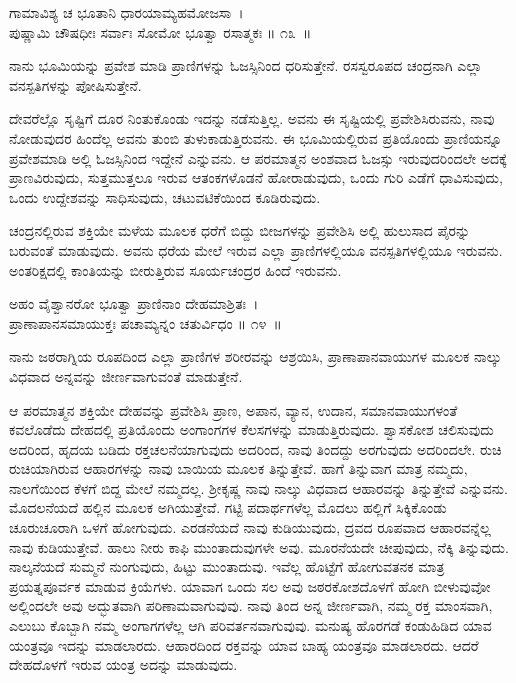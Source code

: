 \begin{shloka}
ಗಾಮಾವಿಶ್ಯ ಚ ಭೂತಾನಿ ಧಾರಯಾಮ್ಯಹಮೋಜಸಾ~।\\ಪುಷ್ಣಾಮಿ ಚೌಷಧೀಃ ಸರ್ವಾಃ ಸೋಮೋ ಭೂತ್ವಾ ರಸಾತ್ಮಕಃ \hfill॥ ೧೩~॥
\end{shloka}

\begin{artha}
ನಾನು ಭೂಮಿಯನ್ನು ಪ್ರವೇಶ ಮಾಡಿ ಪ್ರಾಣಿಗಳನ್ನು ಓಜಸ್ಸಿನಿಂದ ಧರಿಸುತ್ತೇನೆ. ರಸಸ್ವರೂಪದ ಚಂದ್ರನಾಗಿ ಎಲ್ಲಾ ವನಸ್ಪತಿಗಳನ್ನು ಪೋಷಿಸುತ್ತೇನೆ.
\end{artha}

ದೇವರೆಲ್ಲೊ ಸೃಷ್ಟಿಗೆ ದೂರ ನಿಂತುಕೊಂಡು ಇದನ್ನು ನಡೆಸುತ್ತಿಲ್ಲ. ಅವನು ಈ ಸೃಷ್ಟಿಯಲ್ಲಿ ಪ್ರವೇಶಿಸಿರುವನು, ನಾವು ನೋಡುವುದರ ಹಿಂದೆಲ್ಲ ಅವನು ತುಂಬಿ ತುಳುಕಾಡುತ್ತಿರುವನು. ಈ ಭೂಮಿಯಲ್ಲಿರುವ ಪ್ರತಿಯೊಂದು ಪ್ರಾಣಿಯನ್ನೂ ಪ್ರವೇಶಮಾಡಿ ಅಲ್ಲಿ ಓಜಸ್ಸಿನಿಂದ ಇದ್ದೇನೆ ಎನ್ನುವನು. ಆ ಪರಮಾತ್ಮನ ಅಂಶವಾದ ಓಜಸ್ಸು ಇರುವುದರಿಂದಲೇ ಅದಕ್ಕೆ ಪ್ರಾಣವಿರುವುದು, ಸುತ್ತಮುತ್ತಲೂ ಇರುವ ಆತಂಕಗಳೊಡನೆ ಹೋರಾಡುವುದು, ಒಂದು ಗುರಿ ಎಡೆಗೆ ಧಾವಿಸುವುದು, ಒಂದು ಉದ್ದೇಶವನ್ನು ಸಾಧಿಸುವುದು, ಚಟುವಟಿಕೆಯಿಂದ ಕೂಡಿರುವುದು.

ಚಂದ್ರನಲ್ಲಿರುವ ಶಕ್ತಿಯೇ ಮಳೆಯ ಮೂಲಕ ಧರೆಗೆ ಬಿದ್ದು ಬೀಜಗಳನ್ನು ಪ್ರವೇಶಿಸಿ ಅಲ್ಲಿ ಹುಲುಸಾದ ಪೈರನ್ನು ಬರುವಂತೆ ಮಾಡುವುದು. ಅವನು ಧರೆಯ ಮೇಲೆ ಇರುವ ಎಲ್ಲಾ ಪ್ರಾಣಿಗಳಲ್ಲಿಯೂ ವನಸ್ಪತಿಗಳಲ್ಲಿಯೂ ಇರುವನು. ಅಂತರಿಕ್ಷದಲ್ಲಿ ಕಾಂತಿಯನ್ನು ಬೀರುತ್ತಿರುವ ಸೂರ್ಯಚಂದ್ರರ ಹಿಂದೆ ಇರುವನು.

\begin{shloka}
ಅಹಂ ವೈಶ್ವಾನರೋ ಭೂತ್ವಾ ಪ್ರಾಣಿನಾಂ ದೇಹಮಾಶ್ರಿತಃ~।\\ಪ್ರಾಣಾಪಾನಸಮಾಯುಕ್ತಃ ಪಚಾಮ್ಯನ್ನಂ ಚತುರ್ವಿಧಂ \hfill॥ ೧೪~॥
\end{shloka}

\begin{artha}
ನಾನು ಜಠರಾಗ್ನಿಯ ರೂಪದಿಂದ ಎಲ್ಲಾ ಪ್ರಾಣಿಗಳ ಶರೀರವನ್ನು ಆಶ್ರಯಿಸಿ, ಪ್ರಾಣಾಪಾನವಾಯುಗಳ ಮೂಲಕ ನಾಲ್ಕು ವಿಧವಾದ ಅನ್ನವನ್ನು ಜೀರ್ಣವಾಗುವಂತೆ ಮಾಡುತ್ತೇನೆ.
\end{artha}

ಆ ಪರಮಾತ್ಮನ ಶಕ್ತಿಯೇ ದೇಹವನ್ನು ಪ್ರವೇಶಿಸಿ ಪ್ರಾಣ, ಅಪಾನ, ವ್ಯಾನ, ಉದಾನ, ಸಮಾನವಾಯುಗಳಂತೆ ಕವಲೊಡೆದು ದೇಹದಲ್ಲಿ ಪ್ರತಿಯೊಂದು ಅಂಗಾಂಗಗಳ ಕೆಲಸಗಳನ್ನು ಮಾಡುತ್ತಿರುವುದು. ಶ್ವಾಸಕೋಶ ಚಲಿಸುವುದು ಅದರಿಂದ, ಹೃದಯ ಬಡಿದು ರಕ್ತಚಲನೆಯಾಗುವುದು ಅದರಿಂದ, ನಾವು ತಿಂದದ್ದು ಅರಗುವುದು ಅದರಿಂದಲೇ. ರುಚಿ ರುಚಿಯಾಗಿರುವ ಆಹಾರಗಳನ್ನು ನಾವು ಬಾಯಿಯ ಮೂಲಕ ತಿನ್ನುತ್ತೇವೆ. ಹಾಗೆ ತಿನ್ನುವಾಗ ಮಾತ್ರ ನಮ್ಮದು, ನಾಲಗೆಯಿಂದ ಕೆಳಗೆ ಬಿದ್ದ ಮೇಲೆ ನಮ್ಮದಲ್ಲ. ಶ‍್ರೀಕೃಷ್ಣ ನಾವು ನಾಲ್ಕು ವಿಧವಾದ ಆಹಾರವನ್ನು ತಿನ್ನುತ್ತೇವೆ ಎನ್ನುವನು. ಮೊದಲನೆಯದೆ ಹಲ್ಲಿನ ಮೂಲಕ ಅಗಿಯುತ್ತೇವೆ. ಗಟ್ಟಿ ಪದಾರ್ಥಗಳೆಲ್ಲ ಮೊದಲು ಹಲ್ಲಿಗೆ ಸಿಕ್ಕಿಕೊಂಡು ಚೂರುಚೂರಾಗಿ ಒಳಗೆ ಹೋಗುವುದು. ಎರಡನೆಯದೆ ನಾವು ಕುಡಿಯುವುದು, ದ್ರವದ ರೂಪವಾದ ಆಹಾರವನ್ನೆಲ್ಲ ನಾವು ಕುಡಿಯುತ್ತೇವೆ. ಹಾಲು ನೀರು ಕಾಫಿ ಮುಂತಾದುವುಗಳೇ ಅವು. ಮೂರನೆಯದೇ ಚೀಪುವುದು, ನೆಕ್ಕಿ ತಿನ್ನುವುದು. ನಾಲ್ಕನೆಯದೆ ಸುಮ್ಮನೆ ನುಂಗುವುದು, ಹಿಟ್ಟು ಮುಂತಾದುವು. ಇವೆಲ್ಲ ಹೊಟ್ಟೆಗೆ ಹೋಗುವತನಕ ಮಾತ್ರ ಪ್ರಯತ್ನಪೂರ್ವಕ ಮಾಡುವ ಕ್ರಿಯೆಗಳು. ಯಾವಾಗ ಒಂದು ಸಲ ಅವು ಜಠರಕೋಶದೊಳಗೆ ಹೋಗಿ ಬೀಳುವುವೋ ಅಲ್ಲಿಂದಲೇ ಅವು ಅದ್ಭುತವಾಗಿ ಪರಿಣಾಮವಾಗುವುವು. ನಾವು ತಿಂದ ಅನ್ನ ಜೀರ್ಣವಾಗಿ, ನಮ್ಮ ರಕ್ತ ಮಾಂಸವಾಗಿ, ಎಲುಬು ಕೊಬ್ಬಾಗಿ ನಮ್ಮ ಅಂಗಾಗಗಳೆಲ್ಲ ಆಗಿ ಪರಿವರ್ತನವಾಗುವುವು. ಮನುಷ್ಯ ಹೊರಗಡೆ ಕಂಡುಹಿಡಿದ ಯಾವ ಯಂತ್ರವೂ ಇದನ್ನು ಮಾಡಲಾರದು. ಆಹಾರದಿಂದ ರಕ್ತವನ್ನು ಯಾವ ಬಾಹ್ಯ ಯಂತ್ರವೂ ಮಾಡಲಾರದು. ಆದರೆ ದೇಹದೊಳಗೆ ಇರುವ ಯಂತ್ರ ಅದನ್ನು ಮಾಡುವುದು.

